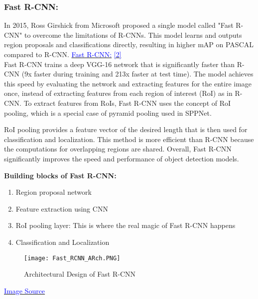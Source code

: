 \subsubsection{Fast R-CNN:} In 2015, Ross Girshick from Microsoft proposed a single model called "Fast R-CNN" to overcome the limitations of R-CNNs. This model learns and outputs region proposals and classifications directly, resulting in higher mAP on PASCAL compared to R-CNN.  \href{https://arxiv.org/pdf/1504.08083.pdf}{\textcolor{blue}{Fast R-CNN:}}
\href{https://medium.com/alegion/deep-learning-for-object-detection-and-localization-using-fast-r-cnn-85d52e3928a1}{\textcolor{blue}{[2]}}\\
Fast R-CNN trains a deep VGG-16 network that is significantly faster than R-CNN (9x faster during training and 213x faster at test time). The model achieves this speed by evaluating the network and extracting features for the entire image once, instead of extracting features from each region of interest (RoI) as in R-CNN. To extract features from RoIs, Fast R-CNN uses the concept of RoI pooling, which is a special case of pyramid pooling used in SPPNet. 

RoI pooling provides a feature vector of the desired length that is then used for classification and localization. This method is more efficient than R-CNN because the computations for overlapping regions are shared. Overall, Fast R-CNN significantly improves the speed and performance of object detection models.
        

\textbf{Building blocks of Fast R-CNN:}
    \begin{enumerate}
        \item Region proposal network
        \item Feature extraction using CNN
        \item RoI pooling layer: This is where the real magic of Fast R-CNN happens
        \item Classification and Localization
    \end{enumerate}
        
    \begin{figure}[H]
        \centering
        \texttt{[image: Fast\_RCNN\_ARch.PNG]}
        \caption{Architectural Design of Fast R-CNN \cite{girshick2014rich}}
        \label{fig: Fast R-CNN}
    \end{figure}
\href{https://www.mathworks.com/help/vision/ug/getting-started-with-r-cnn-fast-r-cnn-and-faster-r-cnn.html#d117e11449}{\textcolor{blue}{Image Source}}
        
